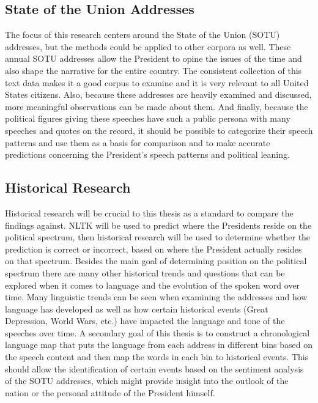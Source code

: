 \documentclass[reqno,12pt,oneside,letter]{report}
\begin{document}
\subsection*{State of the Union Addresses}
The focus of this research centers around the State of the Union (SOTU) addresses, but the methods could be applied to other corpora as well.
These annual SOTU addresses allow the President to opine the issues of the time and also shape the narrative for the entire country.
The consistent collection of this text data makes it a good corpus to examine and it is very relevant to all United States citizens.
Also, because these addresses are heavily examined and discussed, more meaningful observations can be made about them.
And finally, because the political figures giving these speeches have such a public persona with many speeches and quotes on the record, it should be possible to categorize their speech patterns and use them as a basis for comparison and to make accurate predictions concerning the President's speech patterns and political leaning.

\subsection*{Historical Research}
Historical research will be crucial to this thesis as a standard to compare the findings against.
NLTK will be used to predict where the Presidents reside on the political spectrum, then historical research will be used to determine whether the prediction is correct or incorrect, based on where the President actually resides on that spectrum.
Besides the main goal of determining position on the political spectrum there are many other historical trends and questions that can be explored when it comes to language and the evolution of the spoken word over time.
Many linguistic trends can be seen when examining the addresses and how language has developed as well as how certain historical events (Great Depression, World Wars, etc.) have impacted the language and tone of the speeches over time. 
A secondary goal of this thesis is to construct a chronological language map that puts the language from each address in different bins based on the speech content and then map the words in each bin to historical events.
This should allow the identification of certain events based on the sentiment analysis of the SOTU addresses, which might provide insight into the outlook of the nation or the personal attitude of the President himself.
\end{document}
